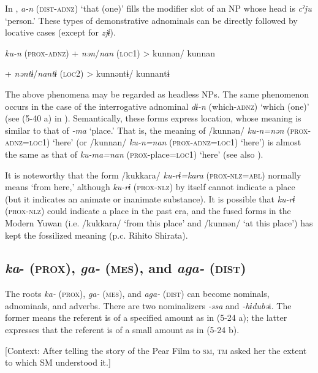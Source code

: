 In , \textit{a-n} (\textsc{dist}-\textsc{adnz}) ‘that (one)’ fills the modifier slot of an NP whose head is \textit{cˀju} ‘person.’ These types of demonstrative adnominals can be directly followed by locative cases (except for \textit{zjɨ}).

\ea \label{ex:5:23}   \textit{ku-n}  (\textsc{prox}-\textsc{adnz})  +  \textit{nən}/\textit{nan}  (\textsc{loc}1)  >  kunnən/ kunnan

      +  \textit{nəntɨ}/\textit{nantɨ}  (\textsc{loc}2)  >  kunnəntɨ/ kunnantɨ
\z

\noindent The above phenomena may be regarded as headless NPs. The same phenomenon occurs in the case of the interrogative adnominal \textit{dɨ-n} (which-\textsc{adnz}) ‘which (one)’ (see (5-40 a) in ). Semantically, these forms express location, whose meaning is similar to that of \textit{{}-ma} ‘place.’ That is, the meaning of /kunnən/ \textit{ku-n=nən} (\textsc{prox}-\textsc{adnz}=\textsc{loc}1) ‘here’ (or /kunnan/ \textit{ku-n=nan} (\textsc{prox}-\textsc{adnz}=\textsc{loc}1) ‘here’) is almost the same as that of \textit{ku-ma=nan} (\textsc{prox}-place=\textsc{loc}1) ‘here’ (see also ).

It is noteworthy that the form /kukkara/ \textit{ku-rɨ=kara} (\textsc{prox-nlz=abl}) normally means ‘from here,’ although \textit{ku-rɨ} (\textsc{prox-nlz}) by itself cannot indicate a place (but it indicates an animate or inanimate substance). It is possible that \textit{ku-rɨ} (\textsc{prox-nlz}) could indicate a place in the past era, and the fused forms in the Modern Yuwan (i.e. /kukkara/ ‘from this place’ and /kunnən/ ‘at this place’) has kept the fossilized meaning (p.c. Rihito Shirata).

\subsection{\textit{ka}{}- (\textsc{prox}), \textit{ga-} (\textsc{mes}), and \textit{aga-} (\textsc{dist})}

The roots \textit{ka-} (\textsc{prox}), \textit{ga-} (\textsc{mes}), and \textit{aga-} (\textsc{dist}) can become nominals, adnominals, and adverbs. There are two nominalizers \textit{{}-ssa} and \textit{{}-hɨdubə}i. The former means the referent is of a specified amount as in (5-24 a); the latter expresses that the referent is of a small amount as in (5-24 b).

\ea \label{ex:5:24}  \ea \label{ex:5:24a} [Context: After telling the story of the Pear Film to \textsc{sm}, \textsc{tm} asked her the extent to which SM understood it.]

